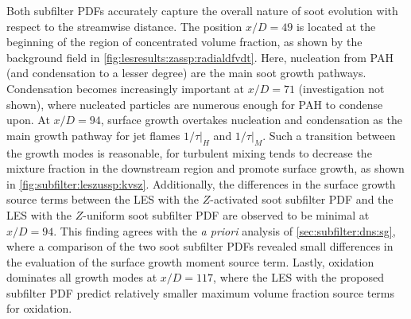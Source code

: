 Both subfilter PDFs accurately capture the overall nature of soot evolution with respect to the streamwise distance. The position $x/D = 49$ is located at the beginning of the region of concentrated volume fraction, as shown by the background field in \cref{fig:lesresults:zassp:radialdfvdt}. Here, nucleation from PAH (and condensation to a lesser degree) are the main soot growth pathways. Condensation becomes increasingly important at $x/D = 71$ (investigation not shown), where nucleated particles are numerous enough for PAH to condense upon. At $x/D = 94$, surface growth overtakes nucleation and condensation as the main growth pathway for jet flames $1/\tau|_H$ and $1/\tau|_M$. Such a transition between the growth modes is reasonable, for turbulent mixing tends to decrease the mixture fraction in the downstream region and promote surface growth, as shown in \cref{fig:subfilter:leszussp:kvsz}. Additionally, the differences in the surface growth source terms between the LES with the $Z$-activated soot subfilter PDF and the LES with the $Z$-uniform soot subfilter PDF are observed to be minimal at $x/D = 94$. This finding agrees with the \textit{a priori} analysis of \cref{sec:subfilter:dns:sg}, where a comparison of the two soot subfilter PDFs revealed small differences in the evaluation of the surface growth moment source term. Lastly, oxidation dominates all growth modes at $x/D = 117$, where the LES with the proposed subfilter PDF predict relatively smaller maximum volume fraction source terms for oxidation.

